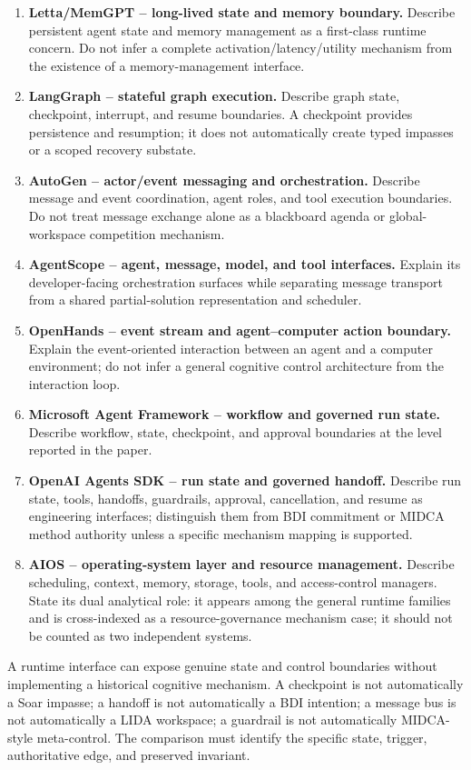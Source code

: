 \begin{enumerate}
  \item \textbf{Letta/MemGPT -- long-lived state and memory boundary.} Describe persistent agent state and memory management as a first-class runtime concern. Do not infer a complete activation/latency/utility mechanism from the existence of a memory-management interface.
  \item \textbf{LangGraph -- stateful graph execution.} Describe graph state, checkpoint, interrupt, and resume boundaries. A checkpoint provides persistence and resumption; it does not automatically create typed impasses or a scoped recovery substate.
  \item \textbf{AutoGen -- actor/event messaging and orchestration.} Describe message and event coordination, agent roles, and tool execution boundaries. Do not treat message exchange alone as a blackboard agenda or global-workspace competition mechanism.
  \item \textbf{AgentScope -- agent, message, model, and tool interfaces.} Explain its developer-facing orchestration surfaces while separating message transport from a shared partial-solution representation and scheduler.
  \item \textbf{OpenHands -- event stream and agent--computer action boundary.} Explain the event-oriented interaction between an agent and a computer environment; do not infer a general cognitive control architecture from the interaction loop.
  \item \textbf{Microsoft Agent Framework -- workflow and governed run state.} Describe workflow, state, checkpoint, and approval boundaries at the level reported in the paper.
  \item \textbf{OpenAI Agents SDK -- run state and governed handoff.} Describe run state, tools, handoffs, guardrails, approval, cancellation, and resume as engineering interfaces; distinguish them from BDI commitment or MIDCA method authority unless a specific mechanism mapping is supported.
  \item \textbf{AIOS -- operating-system layer and resource management.} Describe scheduling, context, memory, storage, tools, and access-control managers. State its dual analytical role: it appears among the general runtime families and is cross-indexed as a resource-governance mechanism case; it should not be counted as two independent systems.
\end{enumerate}

\begin{warningbox}
A runtime interface can expose genuine state and control boundaries without implementing a historical cognitive mechanism. A checkpoint is not automatically a Soar impasse; a handoff is not automatically a BDI intention; a message bus is not automatically a LIDA workspace; a guardrail is not automatically MIDCA-style meta-control. The comparison must identify the specific state, trigger, authoritative edge, and preserved invariant.
\end{warningbox}

